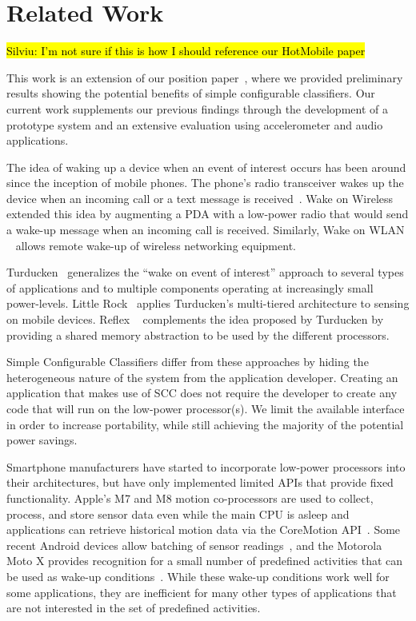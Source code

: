 \section{Related Work}\label{sec:related}
\hl{ Silviu: I'm not sure if this is how I should reference our HotMobile paper}

This work is an extension of our position paper~\cite{todo}, 
where we provided preliminary results showing the potential benefits
of simple configurable classifiers. Our current work supplements our 
previous findings through the development of
a prototype system and an extensive evaluation using accelerometer 
and audio applications.

The idea of waking up a device when an event of interest occurs has been 
around since the inception of mobile phones. The phone's radio 
transceiver wakes up the device when an incoming call or a text message 
is received~\cite{gobi}. Wake on Wireless~\cite{shih2002wake} extended this idea by 
augmenting a PDA with a low-power radio that would send a wake-up message 
when an incoming call is received. Similarly, Wake on WLAN
~\cite{mishra2006wake} allows remote wake-up of wireless networking
equipment.

Turducken~\cite{turducken} generalizes the ``wake on event of interest'' 
approach to several types of applications and to multiple components 
operating at increasingly small power-levels. Little Rock~\cite{littlerock} 
applies Turducken's multi-tiered architecture to sensing on mobile 
devices. Reflex ~\cite{reflex} complements the idea proposed by Turducken 
by providing a shared memory abstraction to be used by the different 
processors.

Simple Configurable Classifiers differ from these approaches by hiding the heterogeneous 
nature of the system from the application developer. Creating an 
application that makes use of SCC does not require 
the developer to create any code that will run on the low-power 
processor(s).  We limit the available interface in order to increase 
portability, 
while still achieving the majority of the potential power savings.

Smartphone manufacturers have started to incorporate low-power
processors into their architectures, but have only implemented limited
APIs that provide fixed functionality.  Apple's M7 and M8 motion
co-processors are used to collect, process, and store sensor data 
even while the main CPU is asleep and applications can retrieve 
historical motion data via the CoreMotion API~\cite{coreMotion}.  Some
recent Android devices allow
batching of sensor readings~\cite{xx,xx}, and the
Motorola Moto X provides recognition for a small number of predefined
activities that can be used as wake-up conditions~\cite{motox}.  While
these wake-up conditions work well for some applications, they are
inefficient for many other types of applications that are not
interested in the set of predefined activities.

